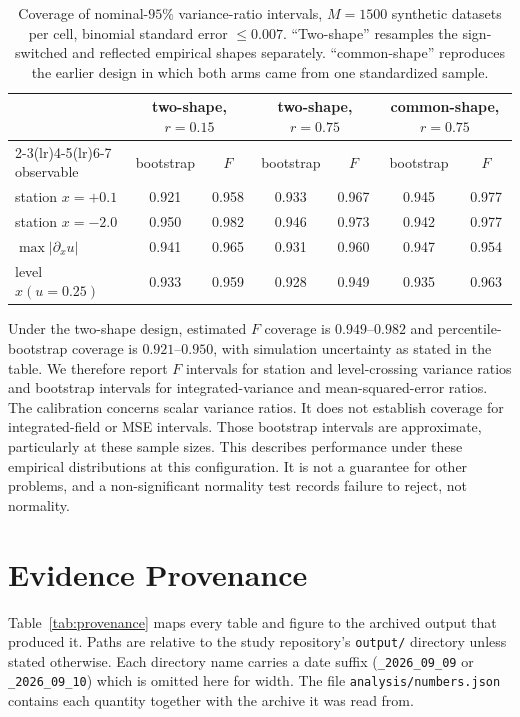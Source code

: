 \documentclass[smallextended,nospthms]{svjour3}
\theoremstyle{plain}
\theoremstyle{definition}
\theoremstyle{remark}
\numberwithin{equation}{section}
\begin{document}
\begin{table}[htbp]
\centering
\caption{Coverage of nominal-$95\%$ variance-ratio intervals, $M=1500$
synthetic datasets per cell, binomial standard error $\le0.007$. ``Two-shape''
resamples the sign-switched and reflected empirical shapes separately.
``common-shape'' reproduces the earlier design in which both arms came from one
standardized sample.}
\label{tab:calibration}
\small
\small
\setlength{\tabcolsep}{3pt}
\begin{tabular}{lcccccc}
\toprule
& \multicolumn{2}{c}{two-shape, $r=0.15$} & \multicolumn{2}{c}{two-shape, $r=0.75$}
& \multicolumn{2}{c}{common-shape, $r=0.75$}\\
\cmidrule(lr){2-3}\cmidrule(lr){4-5}\cmidrule(lr){6-7}
observable & bootstrap & $F$ & bootstrap & $F$ & bootstrap & $F$\\
\midrule
station $x=+0.1$    & 0.921 & 0.958 & 0.933 & 0.967 & 0.945 & 0.977\\
station $x=-2.0$    & 0.950 & 0.982 & 0.946 & 0.973 & 0.942 & 0.977\\
$\max|\partial_xu|$ & 0.941 & 0.965 & 0.931 & 0.960 & 0.947 & 0.954\\
level $x(u=0.25)$   & 0.933 & 0.959 & 0.928 & 0.949 & 0.935 & 0.963\\
\bottomrule
\end{tabular}
\end{table}

Under the two-shape design, estimated $F$ coverage is $0.949$--$0.982$
and percentile-bootstrap coverage is $0.921$--$0.950$, with simulation uncertainty
as stated in the table. We therefore report $F$ intervals for station and
level-crossing variance ratios and bootstrap intervals for integrated-variance
and mean-squared-error ratios. The calibration concerns scalar variance ratios. It does not establish coverage for integrated-field or MSE intervals. Those
bootstrap intervals are approximate, particularly at these sample sizes. This describes performance under these empirical
distributions at this configuration. It is not a guarantee for other
problems, and a non-significant normality test records failure to reject, not
normality.

\section{Evidence Provenance}
\label{app:provenance}

Table~\ref{tab:provenance} maps every table and figure to the archived output
that produced it. Paths are relative to the study repository's
\texttt{output/} directory unless stated otherwise. Each directory name
carries a date suffix (\texttt{\_2026\_09\_09} or \texttt{\_2026\_09\_10})
which is omitted here for width. The file
\texttt{analysis/numbers.json} contains each quantity together with the archive
it was read from.
\end{document}
